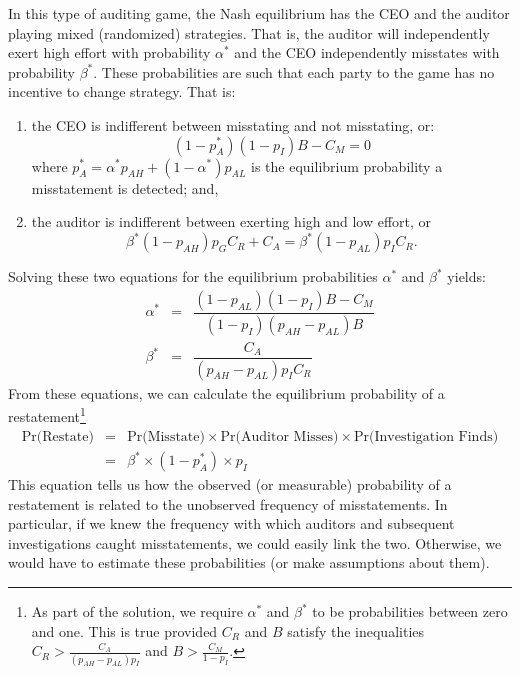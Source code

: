In this type of auditing game, the Nash equilibrium has the CEO and the auditor playing mixed (randomized) strategies.
That is, the auditor will independently exert high effort with probability $\alpha^*$ and the CEO independently misstates with probability $\beta^*$. 
These probabilities are such that each party to the game has no incentive to change strategy. 
That is:
\begin{enumerate}
\item the CEO
is indifferent between misstating and not misstating, or:
\begin{equation}\label{manager}
(1 - p_A^*)(1 - p_I) B - C_M = 0 
\end{equation}
where $p_A^* = \alpha^* p_{AH }+ (1-\alpha^*) p_{AL}$ is the equilibrium 
probability a misstatement is detected; and,
\item the auditor is indifferent between exerting high and low effort, or
$$ \beta^* (1-p_{AH}) p_G C_R + C_A = \beta^* (1-p_{AL}) p_I C_R .$$
\end{enumerate}

Solving these two equations for the equilibrium probabilities $\alpha^*$ and $\beta^*$
yields:
\begin{equation}\label{equilstrat}
\begin{array}{lcl}
  \alpha^* &= & \dfrac{ ( 1 - p_{AL}) (1 - p_I) B- C_M}{ (1 - p_I) (p_{AH}-p_{AL}) B}\\[1.5em]
  \beta^* &= & \dfrac{C_A}{(p_{AH}-p_{AL}) p_I C_R}  
\end{array}
\end{equation}
From these equations, we can calculate the equilibrium probability of a restatement\footnote{
As part of the solution, we require $\alpha^*$ and $\beta^*$ to be probabilities between
zero and one. 
This is true provided $C_R$ and $B$ satisfy the inequalities
$ C_R > \frac{C_A}{(p_{AH}-p_{AL})p_I} $
and 
$ B > \frac{C_M}{1 - p_I}  $.}
\begin{equation} \label{equilpr1}
\begin{array}{lcl}
\mbox{Pr(Restate)} & = &  \mbox{Pr(Misstate)} \times \mbox{Pr(Auditor Misses)} \times
\mbox{Pr(Investigation Finds)}\\[1em]
& = & \beta^* \times (1-p_A^*) \times p_I
\end{array}\end{equation}
This equation tells us how the observed (or measurable) probability of a restatement is related to
the unobserved frequency of misstatements. In particular, if we knew the frequency with which auditors and subsequent investigations caught misstatements, we could easily link the two. Otherwise,
we would have to estimate these probabilities (or make assumptions about them).

